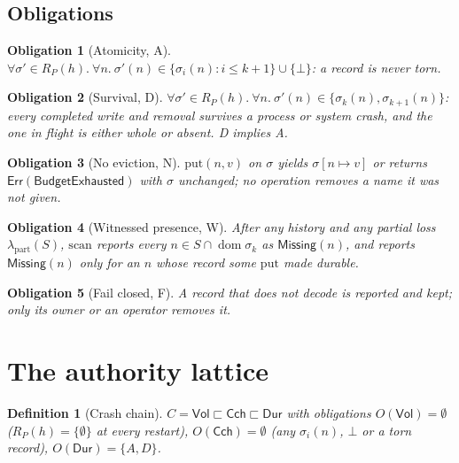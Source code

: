 \documentclass[journal]{IEEEtran}
\newtheorem{definition}{Definition}
\newtheorem{obligation}{Obligation}
\newcommand{\dom}{\operatorname{dom}}
\newcommand{\Err}{\mathsf{Err}}
\newcommand{\Missing}{\mathsf{Missing}}
\newcommand{\Exhausted}{\mathsf{BudgetExhausted}}
\newcommand{\Volatile}{\mathsf{Vol}}
\newcommand{\Cached}{\mathsf{Cch}}
\newcommand{\Durable}{\mathsf{Dur}}
\begin{document}
\subsection{Obligations}

\begin{obligation}[Atomicity, A]\label{ob:atomicity}
$\forall\sigma'\in R_P(h).\ \forall n.\ \sigma'(n)\in\{\sigma_i(n): i\le k+1\}\cup\{\bot\}$:
a record is never torn.
\end{obligation}

\begin{obligation}[Survival, D]\label{ob:survival}
$\forall\sigma'\in R_P(h).\ \forall n.\ \sigma'(n)\in\{\sigma_k(n),\sigma_{k+1}(n)\}$:
every completed write and removal survives a process or system crash, and the one in
flight is either whole or absent.  D implies A.
\end{obligation}

\begin{obligation}[No eviction, N]\label{ob:noevict}
$\mathrm{put}(n,v)$ on $\sigma$ yields $\sigma[n\mapsto v]$ or returns
$\Err(\Exhausted)$ with $\sigma$ unchanged; no operation removes a name it was not given.
\end{obligation}

\begin{obligation}[Witnessed presence, W]\label{ob:witness}
After any history and any partial loss $\lambda_{\mathrm{part}}(S)$, $\mathrm{scan}$ reports
every $n\in S\cap\dom\sigma_k$ as $\Missing(n)$, and reports $\Missing(n)$ only for an $n$
whose record some $\mathrm{put}$ made durable.
\end{obligation}

\begin{obligation}[Fail closed, F]\label{ob:failclosed}
A record that does not decode is reported and kept; only its owner or an operator removes it.
\end{obligation}

\section{The authority lattice}\label{sec:lattice}

\begin{definition}[Crash chain]\label{def:crashchain}
$C=\Volatile\sqsubset\Cached\sqsubset\Durable$ with obligations
$O(\Volatile)=\emptyset$ ($R_P(h)=\{\emptyset\}$ at every restart), $O(\Cached)=\emptyset$
(any $\sigma_i(n)$, $\bot$ or a torn record), $O(\Durable)=\{A,D\}$.
\end{definition}
\end{document}
